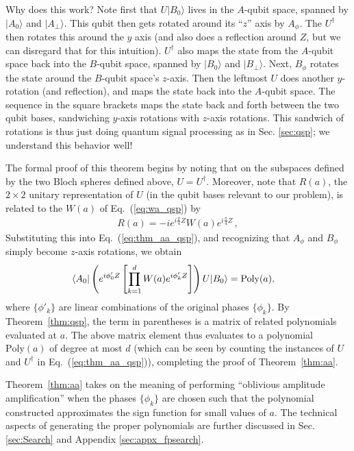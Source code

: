 \documentclass[aps,pra,showpacs,notitlepage,twocolumn,superscriptaddress,nofootinbib]{revtex4-1}
\def\>{\rangle}
\def\<{\langle}
\newcommand{\bea}{\begin{eqnarray}}
\newcommand{\eea}{\end{eqnarray}}
\begin{document}
    Why does this work? Note first that $U|B_0\>$ lives in the $A$-qubit space, spanned by $|A_0\rangle$ and $|A_\perp \rangle$. This qubit then gets rotated around its ``$z$'' axis by $A_\phi$. The $U^\dagger$ then rotates this around the $y$ axis (and also does a reflection around $Z$, but we can disregard that for this intuition).  $U^\dagger$ also maps the state from the $A$-qubit space back into the $B$-qubit space, spanned by $|B_0\rangle$ and $|B_\perp \rangle$. Next, $B_\phi$ rotates the state around the $B$-qubit space's $z$-axis.  Then the leftmost $U$ does another $y$-rotation (and reflection), and maps the state back into the $A$-qubit space.  The sequence in the square brackets maps the state back and forth between the two qubit bases, sandwiching $y$-axis rotations with $z$-axis rotations. This sandwich of rotations is thus just doing quantum signal processing as in Sec. \ref{sec:qsp}; we understand this behavior well!
    
    The formal proof of this theorem begins by noting that on the subspaces defined by the two Bloch spheres defined above, $U = U^\dagger$.  Moreover, note that $R(a)$, the $ 2\times 2$ unitary representation of $U$ (in the qubit bases relevant to our problem), is related to the $W(a)$ of Eq.~(\ref{eq:wa_qsp}) by 
        \bea
        	R(a) = -i e^{i\frac{\pi}{4} Z} W(a)  e^{i\frac{\pi}{4} Z}\,,
        	\label{eq:wa_to_ra}
        \eea
    Substituting this into Eq.~(\ref{eq:thm_aa_qsp}), and recognizing that $A_\phi$ and $B_\phi$ simply become $z$-axis rotations, we obtain
        \bea
            \<A_0 | \left( e^{i\phi'_0 Z} \left[ \prod_{k=1}^{d} W(a) e^{i\phi'_{k} Z} \right] \right) U |B_0\> = {\rm Poly}(a), \quad 
            \label{eq:aa_qsp_seq}
        \eea
    where $\{ \phi'_k\}$ are linear combinations of the original phases $\{ \phi_k\}$. By Theorem~\ref{thm:qsp}, the term in parentheses is a matrix of related polynomials evaluated at $a$. The above matrix element thus evaluates to a polynomial $\text{Poly}(a)$ of degree at most $d$ (which can be seen by counting the instances of $U$ and $U^\dag$ in Eq.~(\ref{eq:thm_aa_qsp})), completing the proof of Theorem~\ref{thm:aa}.
    
    Theorem~\ref{thm:aa} takes on the meaning of performing ``oblivious amplitude amplification'' when the phases $\{\phi_k\}$ are chosen such that the polynomial constructed approximates the sign function for small values of $a$. The technical aspects of generating the proper polynomials are further discussed in Sec. \ref{sec:Search} and Appendix \ref{sec:appx_fpsearch}.
    
\end{document}
